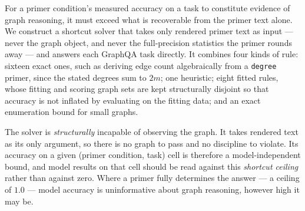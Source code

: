 \documentclass[11pt]{article}
\begin{document}
For a primer condition's measured accuracy on a task to constitute
evidence of graph reasoning, it must exceed what is recoverable from the
primer text alone. We construct a shortcut solver that takes only rendered
primer text as input --- never the graph object, and never the
full-precision statistics the primer rounds away --- and answers each
GraphQA task directly. It combines four kinds of rule: sixteen exact ones,
such as deriving edge count algebraically from a \texttt{degree} primer,
since the stated degrees sum to $2m$; one heuristic; eight fitted rules,
whose fitting and scoring graph sets are kept structurally disjoint so that
accuracy is not inflated by evaluating on the fitting data; and an exact
enumeration bound for small graphs.

The solver is \emph{structurally} incapable of observing the graph. It
takes rendered text as its only argument, so there is no graph to pass and
no discipline to violate. Its accuracy on a given (primer condition, task)
cell is therefore a model-independent bound, and model results on that cell
should be read against this \emph{shortcut ceiling} rather than against
zero. Where a primer fully determines the answer --- a ceiling of $1.0$ ---
model accuracy is uninformative about graph reasoning, however high it may
be.

\begin{table}[t]
\centering
\footnotesize
\setlength{\tabcolsep}{3.2pt}
\caption{Shortcut ceilings: accuracy of a solver that reads only the
rendered primer and never the graph, over $500$ graphs from the GraphQA
generator. \textbf{Bold} marks cells the primer fully determines, on which
no model result can be evidence of graph reasoning. Four of six tasks are
decided this way for at least one primer. Note that a $1.00$ here is what a
Python program scores, not what a model scores: on \texttt{node\_count} the
ceiling is $1.00$ and \citet{fatemi2023talklikeagraph} report $18.8\%$ for
PaLM 2 on the encoding GraphQA ships. A decided cell still answers a
question, but a narrower one --- whether the model uses a fact it was
handed, not whether it reasoned about the graph.}
\label{tab:shortcut}
\end{table}
\end{document}
